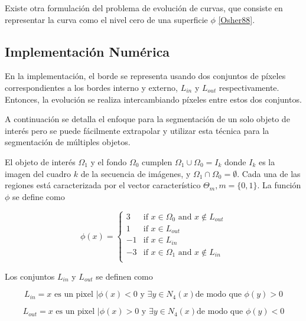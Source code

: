 \documentclass[a4paper,10pt]{article}
\begin{document}
Existe otra formulación del problema de evolución de curvas, que consiste en
representar la curva como el nivel cero de una superficie $\phi$ \ref{Osher88}.

\subsection{Implementación Numérica}

En la implementación, el borde se representa usando dos conjuntos de píxeles
correspondientes a los bordes interno y externo, $L_{in}$ y $L_{out}$
respectivamente. Entonces, la evolución se realiza intercambiando píxeles entre
estos dos conjuntos.

A continuación se detalla el enfoque para la segmentación de un solo objeto de
interés pero se puede fácilmente extrapolar y utilizar esta técnica para la
segmentación de múltiples objetos.


El objeto de interés $\Omega_{1}$ y el fondo $\Omega_{0}$ cumplen
$\Omega_{1}\cup\Omega_{0} = I_{k}$ donde $I_{k}$ es la imagen del cuadro $k$ de
la secuencia de imágenes, y $\Omega_{1}\cap\Omega_{0} = \emptyset$. Cada una de
las regiones está caracterizada por el vector característico $\Theta_{m}, m =
\{0,1\}$. La función $\phi$  se define como

\begin{equation}
\phi(x) =
\left\{
    \begin{array}{ll}
        3  & \mbox{if } x \in \Omega_{0} \mbox{  and  } x \notin L_{out} \\
        1  & \mbox{if } x \in L_{out}\\
        -1  & \mbox{if } x \in L_{in}\\
        -3 & \mbox{if } x \in \Omega_{1} \mbox{  and  } x \notin L_{in} \\
    \end{array}
\right.
\end{equation}

Los conjuntos $L_{in}$ y $L_{out}$ se definen como

\begin{equation}
    L_{in} = {x \mbox{ es un pixel }| \phi(x) < 0 \mbox{ y } \exists y \in N_{4}(x) \mbox{de modo que } \phi(y) > 0}
\end{equation}

\begin{equation}
    L_{out} = {x \mbox{ es un pixel }| \phi(x) > 0 \mbox{ y } \exists y \in N_{4}(x) \mbox{de modo que } \phi(y) < 0}
\end{equation}
\end{document}
